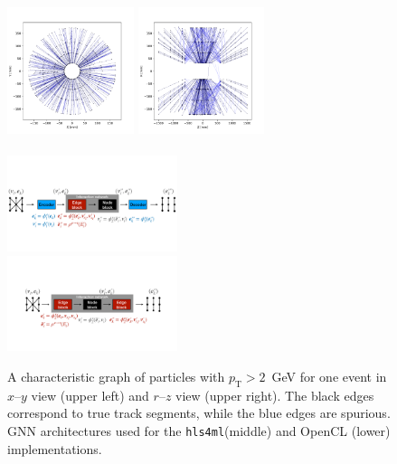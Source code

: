 \documentclass{article}
\newcommand{\hlsfml}{\texttt{hls4ml}\xspace}
\newcommand{\pt}{\ensuremath{p_{\mathrm{T}}}\xspace}
\begin{document}
\begin{figure}[t]
    \centering
    \includegraphics[width=0.33\textwidth,clip=true,viewport = 0 10 392 382]{figures/event000001000_section0_xy.pdf}
    \includegraphics[width=0.33\textwidth,clip=true,viewport = 0 10 392 382]{figures/event000001000_section0_rz.pdf}\\~\\
    \includegraphics[height=2.8cm,clip=true,viewport = 0 270 1920 710]{figures/hls4ml_GNN.pdf}\\[3ex]
    \includegraphics[height=2.8cm,clip=true,viewport = 150 270 1770 710]{figures/OpenCL_GNN.pdf}
    \caption{
    A characteristic graph of particles with $\pt>2$~GeV for one event in $x$--$y$ view (upper left) and $r$--$z$ view (upper right).
    The black edges correspond to true track segments, while the blue edges are spurious.
    GNN architectures used for the \hlsfml (middle) and OpenCL (lower) implementations.}
    \label{fig:graphs}
\end{figure}
\end{document}
